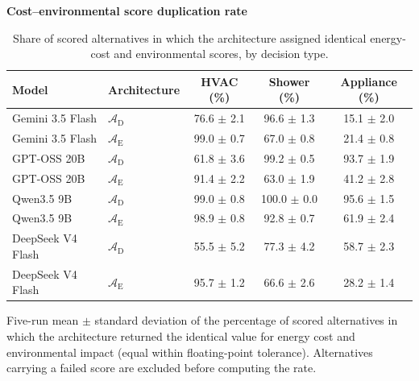 \begin{table}[htbp]
\begin{threeparttable}
  \footnotesize
  \centering
  \textbf{Cost--environmental score duplication rate}
  \begin{tabular}{llccc}
    \toprule
    Model & Architecture & HVAC (\%) & Shower (\%) & Appliance (\%) \\
    \midrule
    Gemini 3.5 Flash & $\mathcal{A}_{\text{D}}$ & 76.6 $\pm$ 2.1 & 96.6 $\pm$ 1.3 & 15.1 $\pm$ 2.0 \\
    \addlinespace
    Gemini 3.5 Flash & $\mathcal{A}_{\text{E}}$ & 99.0 $\pm$ 0.7 & 67.0 $\pm$ 0.8 & 21.4 $\pm$ 0.8 \\
    GPT-OSS 20B & $\mathcal{A}_{\text{D}}$ & 61.8 $\pm$ 3.6 & 99.2 $\pm$ 0.5 & 93.7 $\pm$ 1.9 \\
    \addlinespace
    GPT-OSS 20B & $\mathcal{A}_{\text{E}}$ & 91.4 $\pm$ 2.2 & 63.0 $\pm$ 1.9 & 41.2 $\pm$ 2.8 \\
    Qwen3.5 9B & $\mathcal{A}_{\text{D}}$ & 99.0 $\pm$ 0.8 & 100.0 $\pm$ 0.0 & 95.6 $\pm$ 1.5 \\
    \addlinespace
    Qwen3.5 9B & $\mathcal{A}_{\text{E}}$ & 98.9 $\pm$ 0.8 & 92.8 $\pm$ 0.7 & 61.9 $\pm$ 2.4 \\
    DeepSeek V4 Flash & $\mathcal{A}_{\text{D}}$ & 55.5 $\pm$ 5.2 & 77.3 $\pm$ 4.2 & 58.7 $\pm$ 2.3 \\
    \addlinespace
    DeepSeek V4 Flash & $\mathcal{A}_{\text{E}}$ & 95.7 $\pm$ 1.2 & 66.6 $\pm$ 2.6 & 28.2 $\pm$ 1.4 \\
    \bottomrule
  \end{tabular}
  \begin{tablenotes}
    \item Five-run mean $\pm$ standard deviation of the percentage of scored
    alternatives in which the architecture returned the identical value for
    energy cost and environmental impact (equal within floating-point tolerance).
    Alternatives carrying a failed score are excluded before computing the rate.
  \end{tablenotes}
\end{threeparttable}
\caption{Share of scored alternatives in which the architecture assigned
identical energy-cost and environmental scores, by decision type.}
\label{tab:score_duplication}
\end{table}
